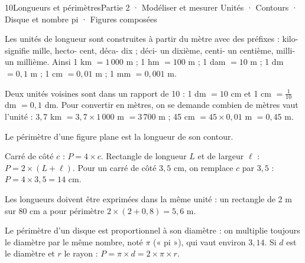 \begin{ouverture}[grandeurs]{10}{Longueurs et périmètres}{Partie 2 · Modéliser et mesurer}
{Unités · Contours · Disque et nombre pi · Figures composées}
\end{ouverture}
\pagestyle{otMain}\essentiel\fontsize{11}{15}\selectfont
{}\label{cours-10-1}
\begin{definition}Les unités de longueur sont construites à partir du mètre avec des préfixes : kilo- signifie mille, hecto- cent, déca- dix ; déci- un dixième, centi- un centième, milli- un millième. Ainsi 1 km $=1\,000$ m ; 1 hm $=100$ m ; 1 dam $=10$ m ; 1 dm $=0{,}1$ m ; 1 cm $=0{,}01$ m ; 1 mm $=0{,}001$ m.\end{definition}
\begin{savoirfaire}Deux unités voisines sont dans un rapport de 10 : 1 dm $=10$ cm et 1 cm $=\frac1{10}$ dm $=0{,}1$ dm. Pour convertir en mètres, on se demande combien de mètres vaut l’unité : $3{,}7$ km $=3{,}7\times1\,000$ m $=3\,700$ m ; 45 cm $=45\times0{,}01$ m $=0{,}45$ m.\end{savoirfaire}
\begin{definition}Le périmètre d’une figure plane est la longueur de son contour.\end{definition}
\begin{propriete}Carré de côté $c$ : $P=4\times c$. Rectangle de longueur $L$ et de largeur $\ell$ : $P=2\times(L+\ell)$. Pour un carré de côté $3{,}5$ cm, on remplace $c$ par $3{,}5$ : $P=4\times3{,}5=14$ cm.\end{propriete}
\begin{attention}Les longueurs doivent être exprimées dans la même unité : un rectangle de 2 m sur 80 cm a pour périmètre $2\times(2+0{,}8)=5{,}6$ m.\end{attention}
\clearpage
{}\label{cours-10-2}
\begin{propriete}Le périmètre d’un disque est proportionnel à son diamètre : on multiplie toujours le diamètre par le même nombre, noté $\pi$ (« pi »), qui vaut environ $3{,}14$. Si $d$ est le diamètre et $r$ le rayon : $P=\pi\times d=2\times\pi\times r$.\end{propriete}
\label{fig-cours-10-2-cours-cercle-diametre}

